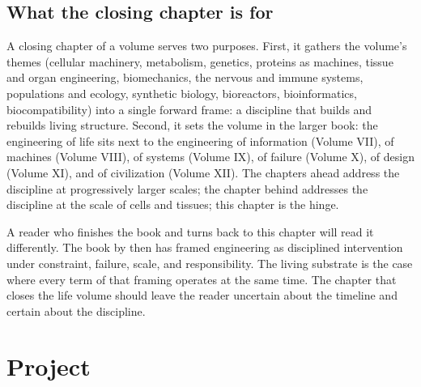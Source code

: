 \subsection{What the closing chapter is for}

A closing chapter of a volume serves two purposes. First, it gathers
the volume's themes (cellular machinery, metabolism, genetics, proteins
as machines, tissue and organ engineering, biomechanics, the nervous
and immune systems, populations and ecology, synthetic biology,
bioreactors, bioinformatics, biocompatibility) into a single forward
frame: a discipline that builds and rebuilds living structure. Second,
it sets the volume in the larger book: the engineering of life sits
next to the engineering of information (Volume VII), of machines
(Volume VIII), of systems (Volume IX), of failure (Volume X), of
design (Volume XI), and of civilization (Volume XII). The chapters
ahead address the discipline at progressively larger scales; the
chapter behind addresses the discipline at the scale of cells and
tissues; this chapter is the hinge.

A reader who finishes the book and turns back to this chapter will
read it differently. The book by then has framed engineering as
disciplined intervention under constraint, failure, scale, and
responsibility. The living substrate is the case where every term of
that framing operates at the same time. The chapter that closes the
life volume should leave the reader uncertain about the timeline and
certain about the discipline.

\section{Project}

